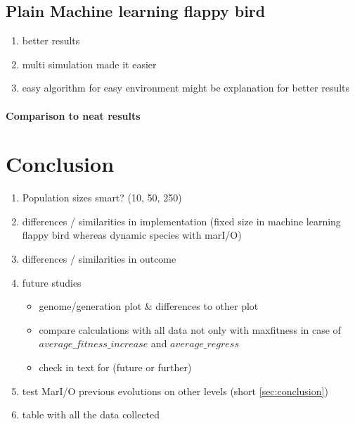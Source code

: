 		\subsection{Plain Machine learning flappy bird}
			\begin{enumerate}
				\item better results
				\item multi simulation made it easier
				\item easy algorithm for easy environment might be explanation for better results
			\end{enumerate}
			\paragraph{Comparison to \gls{neat} results}
	
	
	\section{Conclusion}
		\label{sec:analysis:conclusion}
		\begin{enumerate}
			\item Population sizes smart? (10, 50, 250)
			\item differences / similarities in implementation (fixed size in machine learning flappy bird whereas dynamic species with marI/O)
			\item differences / similarities in outcome
			\item future studies
				\begin{itemize}
					\item genome/generation plot \& differences to other plot
					\item compare calculations with all data not only with maxfitness in case of $average\_fitness\_increase$ and $average\_regress$
					\item check in text for (future or further)
				\end{itemize}
			\item test MarI/O previous evolutions on other levels (short \ref{sec:conclusion})
			\item table with all the data collected 
		\end{enumerate}

